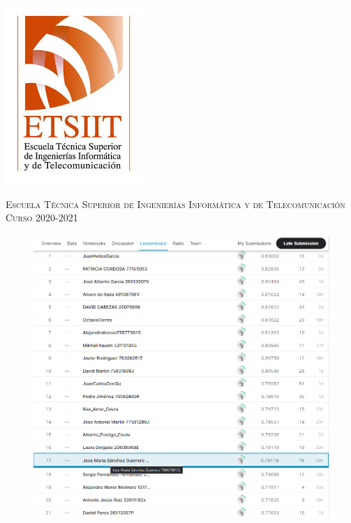 \documentclass[11pt,a4paper]{article}
\begin{document}
\begin{titlepage}
\begin{minipage}{\textwidth}
\includegraphics[scale=0.3]{img/etsiit.jpeg}

\vspace{0.3cm}
\textsc{Escuela Técnica Superior de Ingenierías Informática y de Telecomunicación}\\
\vspace{1cm}
\textsc{Curso 2020-2021}
\end{minipage}
\end{titlepage}

\begin{figure}[H]
    \centering
    \hspace*{-0.5in}
    \includegraphics[scale=0.65]{img/leaderboard.png}
\end{figure}
\end{document}
